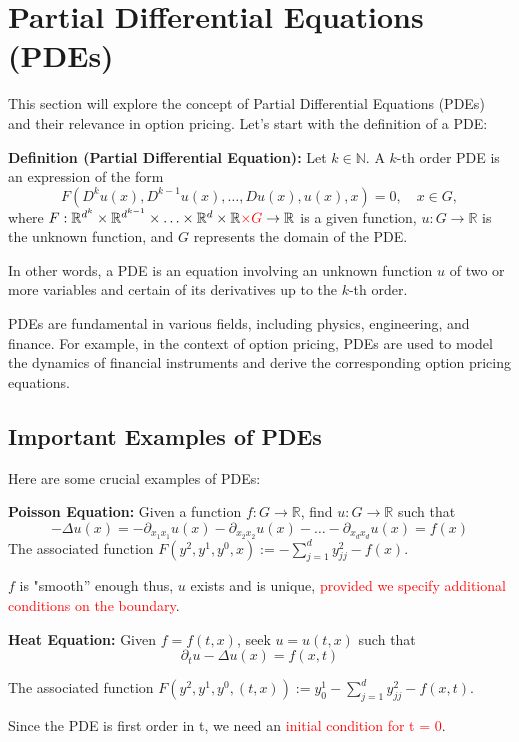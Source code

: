 \section{Partial Differential Equations (PDEs)}

This section will explore the concept of Partial Differential Equations (PDEs) and their relevance in option pricing. Let's start with the definition of a PDE:

\textbf{Definition (Partial Differential Equation):}
Let $k \in \mathbb{N}$. A $k$-th order PDE is an expression of the form
\[F(D^k u(x), D^{k-1} u(x), \ldots, Du(x), u(x), x) = 0, \quad x \in G,\]
where $F : \mathbb{R}^{d^k} \times \mathbb{R}^{d^{k-1}} \times \ldots \times \mathbb{R}^d \times \mathbb{R} \textcolor{red}{\times G} \rightarrow \mathbb{R}$ is a given function, $u : G \rightarrow \mathbb{R}$ is the unknown function, and $G$ represents the domain of the PDE.

In other words, a PDE is an equation involving an unknown function $u$ of two or more variables and certain of its derivatives up to the $k$-th order.

PDEs are fundamental in various fields, including physics, engineering, and finance. For example, in the context of option pricing, PDEs are used to model the dynamics of financial instruments and derive the corresponding option pricing equations.

\subsection{Important Examples of PDEs}

Here are some crucial examples of PDEs:

\textbf{Poisson Equation:}
Given a function $f : G \rightarrow \mathbb{R}$, find $u : G \rightarrow \mathbb{R}$ such that
\[-\Delta u(x) = -\partial_{x_1 x_1} u(x) - \partial_{x_2 x_2} u(x) - \ldots - \partial_{x_d x_d} u(x) = f(x)\]
The associated function $F(y^2, y^1, y^0, x) := -\sum_{j=1}^d y^{2}_{j j} - f(x)$.

$f$ is "smooth” enough thus, $u$ exists and is unique, \textcolor{red}{provided we specify
additional conditions on the boundary}.

\textbf{Heat Equation:}
Given $f = f(t, x)$, seek $u = u(t, x)$ such that
\[\partial_t u - \Delta u(x) = f(x, t)\]

The associated function $F(y^2, y^1, y^0, (t, x)) := y^1_0 - \sum_{j=1}^d y^{2}_{j j} - f(x, t)$.

Since the PDE is first order in t, we need an \textcolor{red}{initial condition for t = 0}.

